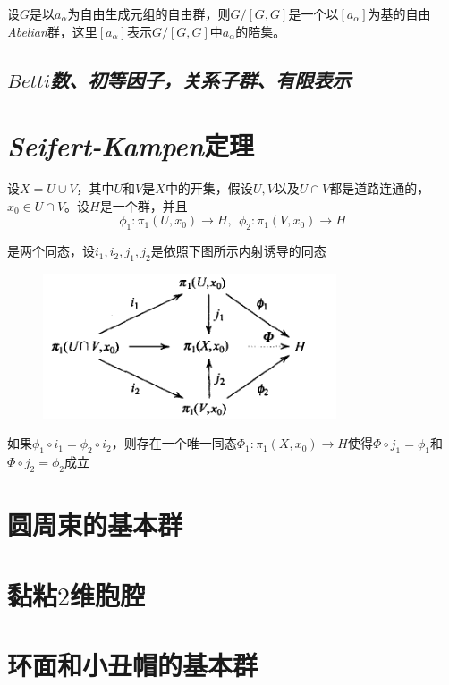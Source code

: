 \begin{mdframed}
    \begin{theorem}
        设$G$是以$a_\alpha$为自由生成元组的自由群，则$G/[G,G]$是一个以$[a_\alpha]$为基的自由\textsl{Abelian}群，这里$[a_\alpha]$表示$G/[G,G]$中$a_\alpha$的陪集。
    \end{theorem}
\end{mdframed}

\subsection*{\textsl{$Betti$数、初等因子，关系子群、有限表示}}

\newpage

\section{\textsl{Seifert-Kampen}定理}

\begin{mdframed}
    \begin{theorem}
         设$X= U \cup V$，其中$U$和$V$是$X$中的开集，假设$U,V$以及$U\cap V$都是道路连通的，$x_0\in U\cap V$。设$H$是一个群，并且
        \begin{equation}
            \phi_1:\pi_1(U,x_0)\rightarrow H,\ \ \phi_2:\pi_1(V,x_0)\rightarrow H
        \end{equation}

        是两个同态，设$i_1,i_2,j_1,j_2$是依照下图所示内射诱导的同态
        \begin{figure}[H]
            \centering
            \includegraphics[scale=0.6]{figures/WX20240902-113016@2x.png}
        \end{figure}

        如果$\phi_1\circ i_1=\phi_2\circ i_2$，则存在一个唯一同态$\Phi_1:\pi_1(X,x_0)\rightarrow H$使得$\Phi\circ j_1=\phi_1$和$\Phi\circ j_2=\phi_2$成立
    \end{theorem}
\end{mdframed}

\section{圆周束的基本群}

\section{黏粘$2$维胞腔}

\section{环面和小丑帽的基本群}